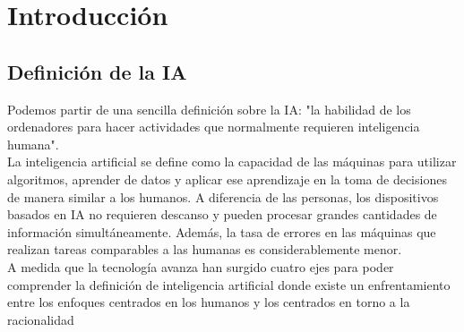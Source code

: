 \section{Introducción}

\subsection{Definición de la IA}

Podemos partir de una sencilla definición sobre la IA: "la habilidad de los ordenadores para hacer
actividades que normalmente requieren inteligencia humana".\\

La inteligencia artificial se define como la capacidad de las máquinas para utilizar algoritmos, 
aprender de datos y aplicar ese aprendizaje en la toma de decisiones de manera similar a los humanos. A diferencia de las 
personas, los dispositivos basados en IA no requieren descanso y pueden procesar grandes cantidades 
de información simultáneamente. Además, la tasa de errores en las máquinas que realizan tareas 
comparables a las humanas es considerablemente menor.\cite{libroDos}\\

A medida que la tecnología avanza han surgido cuatro ejes para poder comprender la definición de 
inteligencia artificial donde existe un enfrentamiento entre los enfoques centrados en los humanos y los
centrados en torno a la racionalidad

